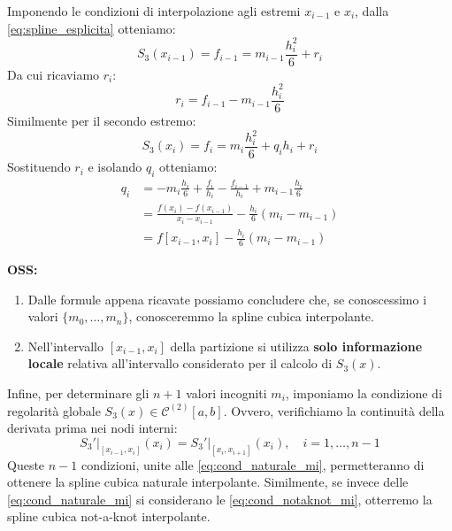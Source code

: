 Imponendo le condizioni di interpolazione agli estremi $x_{i-1}$ e $x_i$, dalla \eqref{eq:spline_esplicita} otteniamo:
$$ S_3(x_{i-1}) = f_{i-1} = m_{i-1}\frac{h_i^2}{6} + r_i $$
Da cui ricaviamo $r_i$:
\begin{equation} \label{eq:costante_ri}
r_i = f_{i-1} - m_{i-1}\frac{h_i^2}{6}
\end{equation}
Similmente per il secondo estremo:
$$ S_3(x_i) = f_i = m_i\frac{h_i^2}{6} + q_i h_i + r_i $$
Sostituendo $r_i$ e isolando $q_i$ otteniamo:
\begin{align} 
q_i &= -m_i\frac{h_i}{6} + \frac{f_i}{h_i} - \frac{f_{i-1}}{h_i} + m_{i-1}\frac{h_i}{6} \nonumber \\
&= \frac{f(x_i) - f(x_{i-1})}{x_i - x_{i-1}} - \frac{h_i}{6}(m_i - m_{i-1}) \nonumber \\
&= f[x_{i-1}, x_i] - \frac{h_i}{6}(m_i - m_{i-1}) \label{eq:costante_qi}
\end{align}

\textbf{OSS:}
\begin{enumerate}
    \item Dalle formule appena ricavate possiamo concludere che, se conoscessimo i valori $\{m_0, \dots, m_n\}$, conosceremmo la spline cubica interpolante.
    \item Nell'intervallo $[x_{i-1}, x_i]$ della partizione si utilizza \textbf{solo informazione locale} relativa all'intervallo considerato per il calcolo di $S_3(x)$.
\end{enumerate}

Infine, per determinare gli $n+1$ valori incogniti $m_i$, imponiamo la condizione di regolarità globale $S_3(x) \in \mathcal{C}^{(2)}[a,b]$. Ovvero, verifichiamo la continuità della derivata prima nei nodi interni:
\begin{equation} \label{eq:continuita_derivata_prima}
\left. S_3' \right|_{[x_{i-1},x_i]}(x_i) = \left. S_3' \right|_{[x_i,x_{i+1}]}(x_i), \quad i=1, \dots, n-1
\end{equation}
Queste $n-1$ condizioni, unite alle \eqref{eq:cond_naturale_mi}, permetteranno di ottenere la spline cubica naturale interpolante. Similmente, se invece delle \eqref{eq:cond_naturale_mi} si considerano le \eqref{eq:cond_notaknot_mi}, otterremo la spline cubica not-a-knot interpolante.

